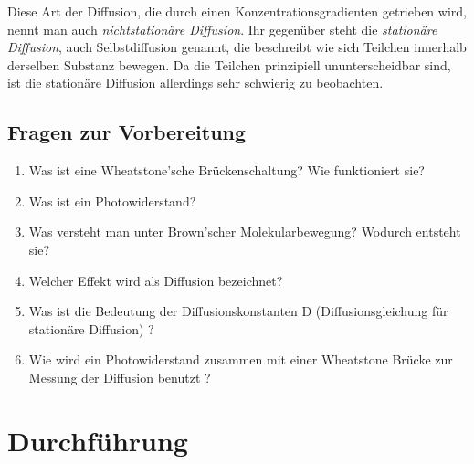 Diese Art der Diffusion, die durch einen Konzentrationsgradienten getrieben wird, nennt man auch \textit{nichtstationäre Diffusion}. Ihr gegenüber steht die \textit{stationäre Diffusion}, auch Selbstdiffusion genannt, die beschreibt wie sich Teilchen innerhalb derselben Substanz bewegen. Da die Teilchen prinzipiell ununterscheidbar sind, ist die stationäre Diffusion allerdings sehr schwierig zu beobachten.

\begin{tutorhint}
\section{Fragen zur Vorbereitung}

\begin{enumerate}
 \item Was ist eine Wheatstone'sche Brückenschaltung? Wie funktioniert sie?
 \item Was ist ein Photowiderstand?
 \item Was versteht man unter Brown'scher Molekularbewegung? Wodurch entsteht sie?
 \item Welcher Effekt wird als Diffusion bezeichnet?
 \item Was ist die Bedeutung der Diffusionskonstanten D (Diffusionsgleichung für stationäre Diffusion) ?
 \item Wie wird ein Photowiderstand zusammen mit einer Wheatstone Brücke zur Messung der Diffusion benutzt ?
%
\end{enumerate}
\end{tutorhint}

\section{Durchführung} 

